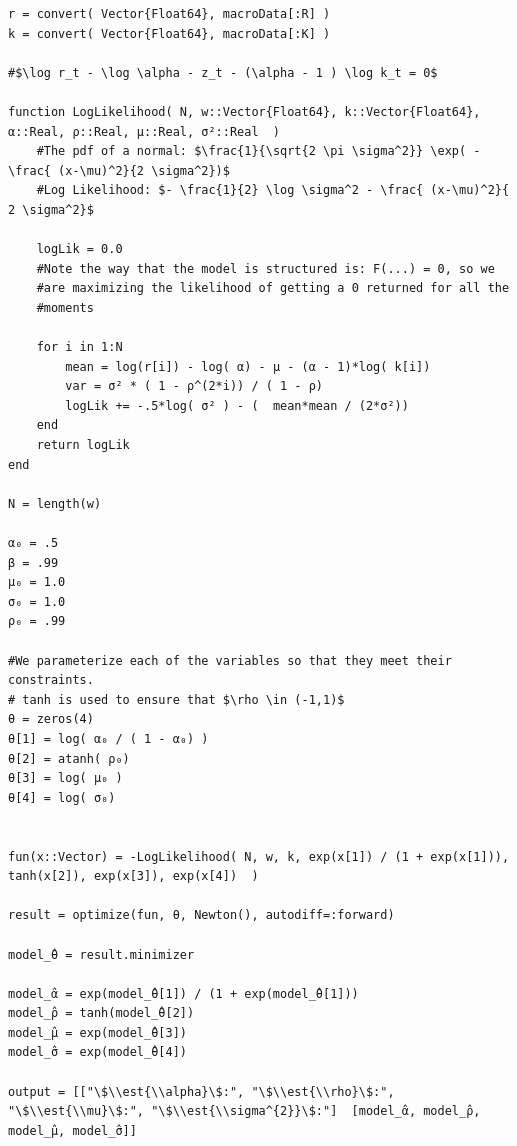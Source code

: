 \documentclass[12pt, letterpaper]{paper}
\begin{document}
\begin{verbatim}
r = convert( Vector{Float64}, macroData[:R] )
k = convert( Vector{Float64}, macroData[:K] )

#$\log r_t - \log \alpha - z_t - (\alpha - 1 ) \log k_t = 0$

function LogLikelihood( N, w::Vector{Float64}, k::Vector{Float64}, α::Real, ρ::Real, μ::Real, σ²::Real  )
    #The pdf of a normal: $\frac{1}{\sqrt{2 \pi \sigma^2}} \exp( - \frac{ (x-\mu)^2}{2 \sigma^2})$
    #Log Likelihood: $- \frac{1}{2} \log \sigma^2 - \frac{ (x-\mu)^2}{ 2 \sigma^2}$

    logLik = 0.0
    #Note the way that the model is structured is: F(...) = 0, so we
    #are maximizing the likelihood of getting a 0 returned for all the
    #moments

    for i in 1:N
        mean = log(r[i]) - log( α) - μ - (α - 1)*log( k[i])
        var = σ² * ( 1 - ρ^(2*i)) / ( 1 - ρ)
        logLik += -.5*log( σ² ) - (  mean*mean / (2*σ²))
    end
    return logLik
end

N = length(w)

α₀ = .5
β = .99
μ₀ = 1.0
σ₀ = 1.0
ρ₀ = .99

#We parameterize each of the variables so that they meet their constraints.
# tanh is used to ensure that $\rho \in (-1,1)$
θ = zeros(4)
θ[1] = log( α₀ / ( 1 - α₀) )
θ[2] = atanh( ρ₀)
θ[3] = log( μ₀ )
θ[4] = log( σ₀)


fun(x::Vector) = -LogLikelihood( N, w, k, exp(x[1]) / (1 + exp(x[1])), tanh(x[2]), exp(x[3]), exp(x[4])  )

result = optimize(fun, θ, Newton(), autodiff=:forward)

model_̂θ = result.minimizer

model_̂α = exp(model_̂θ[1]) / (1 + exp(model_̂θ[1]))
model_̂ρ = tanh(model_̂θ[2])
model_̂μ = exp(model_̂θ[3])
model_̂σ = exp(model_̂θ[4])

output = [["\$\\est{\\alpha}\$:", "\$\\est{\\rho}\$:", "\$\\est{\\mu}\$:", "\$\\est{\\sigma^{2}}\$:"]  [model_̂α, model_̂ρ, model_̂μ, model_̂σ]]
\end{verbatim}
\end{document}
